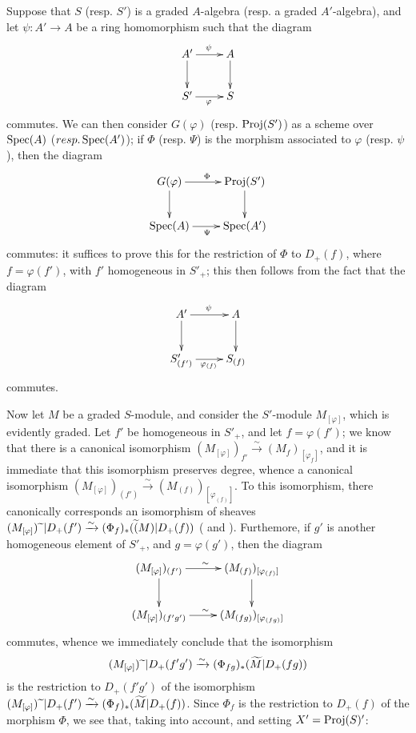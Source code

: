 \begin{env}[2.8.5]
\label{II.2.8.5}
Suppose that $S$ (resp. $S'$) is a graded $A$-algebra (resp. a graded $A'$-algebra), and let $\psi:A'\to A$ be a ring homomorphism such that the diagram
\[
  \xymatrix{
    A' \ar[r]^{\psi} \ar[d]
    & A \ar[d]
  \\S' \ar[r]_{\varphi}
    & S
  }
\]
commutes.
We can then consider $G(\varphi)$ (resp. $\operatorname{Proj}(S')$) as a scheme over $\operatorname{Spec}(A)$ ($resp. \operatorname{Spec}(A')$);
if $\Phi$ (resp. $\Psi$) is the morphism associated to $\varphi$ (resp. $\psi$), then the diagram
\[
  \xymatrix{
    G(\varphi) \ar[r]^{\Phi} \ar[d]
    & \Proj(S') \ar[d]
  \\\Spec(A) \ar[r]_{\Psi}
    & \Spec(A')
  }
\]
commutes: it suffices to prove this for the restriction of $\Phi$ to $D_+(f)$, where $f=\varphi(f')$, with $f'$ homogeneous in $S'_+$;
this then follows from the fact that the diagram
\[
  \xymatrix{
    A' \ar[r]^{\psi} \ar[d]
    & A \ar[d]
  \\S'_{(f')} \ar[r]_{\varphi_{(f)}}
    & S_{(f)}
  }
\]
commutes.
\end{env}

\begin{env}[2.8.6]
\label{II.2.8.6}
Now let $M$ be a graded $S$-module, and consider the $S'$-module $M_{[\varphi]}$, which is evidently graded.
Let $f'$ be homogeneous in $S'_+$, and let $f=\varphi(f')$;
we know  that there is a canonical isomorphism $(M_{[\varphi]})_{f'}\xrightarrow{\sim}(M_f)_{[\varphi_f]}$, and it is immediate that this isomorphism preserves degree, whence a canonical isomorphism $(M_{[\varphi]})_{(f')}\xrightarrow{\sim}(M_{(f)})_{[\varphi_{(f)}]}$.
To this isomorphism, there canonically corresponds an isomorphism of sheaves $(M_{[\varphi]}){\,\widetilde{\,}\,}|D_+(f')\xrightarrow{\sim}(\Phi_f)_*(\widetilde(M)|D_+(f))$ ( and ).
Furthemore,
if $g'$ is another homogeneous element of $S'_+$, and $g=\varphi(g')$, then the diagram
\[
  \xymatrix{
    (M_{[\varphi]})_{(f')} \ar[r]^{\sim} \ar[d]
    & (M_{(f)})_{[\varphi_{(f)}]} \ar[d]
  \\(M_{[\varphi]})_{(f'g')} \ar[r]^{\sim}
    & (M_{(fg)})_{[\varphi_{(fg)}]}
  }
\]
commutes, whence we immediately conclude that the isomorphism
\[
  (M_{[\varphi]}){\,\widetilde{\,}\,}|D_+(f'g') \xrightarrow{\sim} (\Phi_{fg})_*(\widetilde{M}|D_+(fg))
\]
is the restriction to $D_+(f'g')$ of the isomorphism $(M_{[\varphi]}){\,\widetilde{\,}\,}|D_+(f')\xrightarrow{\sim}(\Phi_f)_*(\widetilde{M}|D_+(f))$.
Since $\Phi_f$ is the restriction to $D_+(f)$ of the morphism $\Phi$, we see that, taking  into account, and setting $X'=\operatorname{Proj}(S)'$:
\end{env}


